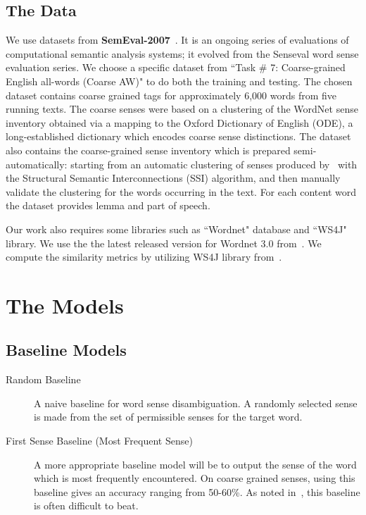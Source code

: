 \documentclass[12pt,letterpaper]{article}
\newcommand{\blue}[1]{\textcolor{RoyalBlue}{#1}}
\newcommand{\instructions}[1]{\blue{\textit{#1}}}
\begin{document}
\subsection{The Data}
\label{sec:data}
We use datasets from \textbf{SemEval-2007}~\cite{semeval}. It is an ongoing series of evaluations of computational semantic analysis systems; it evolved from the Senseval word sense evaluation series. We choose a specific dataset from ``Task \# 7: Coarse-grained English all-words (Coarse AW)" to do both the training and testing. The chosen dataset contains coarse grained tags for approximately 6,000 words from five running texts. The coarse senses were based on a clustering of the WordNet sense inventory obtained via a mapping to the Oxford Dictionary of English (ODE), a long-established dictionary which encodes coarse sense distinctions. The dataset also contains the coarse-grained sense inventory which is prepared semi-automatically: starting from an automatic clustering of senses produced by~\cite{Navigli06} with the Structural Semantic Interconnections (SSI) algorithm, and then manually validate the clustering for the words occurring in the text. For each content word the dataset provides lemma and part of speech.

Our work also requires some libraries such as ``Wordnet" database and ``WS4J" library. We use the the latest released version for Wordnet 3.0 from~\cite{wordneturl}. We compute the similarity metrics by utilizing WS4J library from~\cite{WS4Jurl}.

\section{The Models}
\label{sec:models}

\subsection{Baseline Models}
\label{sec:baseline-models}
\begin{description}
\item[Random Baseline] A naive baseline for word sense disambiguation. A randomly selected sense is made from the set of permissible senses for the target word. \\
\item[First Sense Baseline (Most Frequent Sense)] A more appropriate baseline model will be to output the sense of the word which is most frequently encountered. On coarse grained senses, using this baseline gives an accuracy ranging from 50-60\%. As noted in~\cite{navigli2009word}, this baseline is often difficult to beat. 
\end{description}
%
\end{document}
